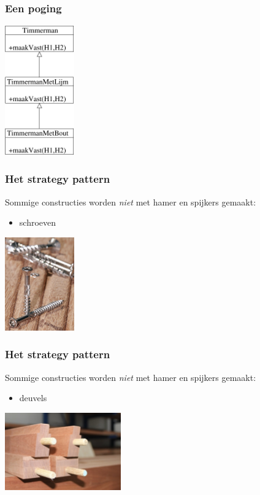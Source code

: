 \documentclass{beamer}
\begin{document}
\begin{frame}
\frametitle{Een poging}
\begin{center}
\includegraphics[width=3cm]{timmer3}
\end{center}
\end{frame}

\begin{frame}
\frametitle{Het strategy pattern}
Sommige constructies worden \emph{niet} met hamer en spijkers gemaakt:
\begin{itemize}
\item schroeven
\end{itemize}
\begin{center}
\includegraphics[width=3cm]{schroef}
\end{center}
\end{frame}

\begin{frame}
\frametitle{Het strategy pattern}
Sommige constructies worden \emph{niet} met hamer en spijkers gemaakt:
\begin{itemize}
\item deuvels
\end{itemize}
\begin{center}
\includegraphics[width=5cm]{deuvel}
\end{center}
\end{frame}
\end{document}
